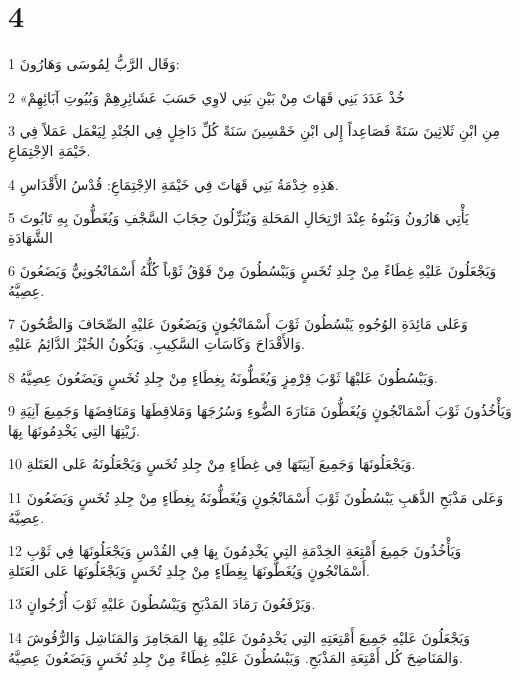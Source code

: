 \chapter{4}

\par 1 وَقَال الرَّبُّ لِمُوسَى وَهَارُونَ:
\par 2 «خُذْ عَدَدَ بَنِي قَهَاتَ مِنْ بَيْنِ بَنِي لاوِي حَسَبَ عَشَائِرِهِمْ وَبُيُوتِ آبَائِهِمْ
\par 3 مِنِ ابْنِ ثَلاثِينَ سَنَةً فَصَاعِداً إِلى ابْنِ خَمْسِينَ سَنَةً كُلِّ دَاخِلٍ فِي الجُنْدِ لِيَعْمَل عَمَلاً فِي خَيْمَةِ الاِجْتِمَاعِ.
\par 4 هَذِهِ خِدْمَةُ بَنِي قَهَاتَ فِي خَيْمَةِ الاِجْتِمَاعِ: قُدْسُ الأَقْدَاسِ.
\par 5 يَأْتِي هَارُونُ وَبَنُوهُ عِنْدَ ارْتِحَالِ المَحَلةِ وَيُنَزِّلُونَ حِجَابَ السَّجْفِ وَيُغَطُّونَ بِهِ تَابُوتَ الشَّهَادَةِ
\par 6 وَيَجْعَلُونَ عَليْهِ غِطَاءً مِنْ جِلدِ تُخَسٍ وَيَبْسُطُونَ مِنْ فَوْقُ ثَوْباً كُلُّهُ أَسْمَانْجُونِيٌّ وَيَضَعُونَ عِصِيَّهُ.
\par 7 وَعَلى مَائِدَةِ الوُجُوهِ يَبْسُطُونَ ثَوْبَ أَسْمَانْجُونٍ وَيَضَعُونَ عَليْهِ الصِّحَافَ وَالصُّحُونَ وَالأَقْدَاحَ وَكَاسَاتِ السَّكِيبِ. وَيَكُونُ الخُبْزُ الدَّائِمُ عَليْهِ.
\par 8 وَيَبْسُطُونَ عَليْهَا ثَوْبَ قِرْمِزٍ وَيُغَطُّونَهُ بِغِطَاءٍ مِنْ جِلدِ تُخَسٍ وَيَضَعُونَ عِصِيَّهُ.
\par 9 وَيَأْخُذُونَ ثَوْبَ أَسْمَانْجُونٍ وَيُغَطُّونَ مَنَارَةَ الضُّوءِ وَسُرُجَهَا وَمَلاقِطَهَا وَمَنَافِضَهَا وَجَمِيعَ آنِيَةِ زَيْتِهَا التِي يَخْدِمُونَهَا بِهَا.
\par 10 وَيَجْعَلُونَهَا وَجَمِيعَ آنِيَتَهَا فِي غِطَاءٍ مِنْ جِلدِ تُخَسٍ وَيَجْعَلُونَهُ عَلى العَتَلةِ.
\par 11 وَعَلى مَذْبَحِ الذَّهَبِ يَبْسُطُونَ ثَوْبَ أَسْمَانْجُونٍ وَيُغَطُّونَهُ بِغِطَاءٍ مِنْ جِلدِ تُخَسٍ وَيَضَعُونَ عِصِيَّهُ.
\par 12 وَيَأْخُذُونَ جَمِيعَ أَمْتِعَةِ الخِدْمَةِ التِي يَخْدِمُونَ بِهَا فِي القُدْسِ وَيَجْعَلُونَهَا فِي ثَوْبِ أَسْمَانْجُونٍ وَيُغَطُّونَهَا بِغِطَاءٍ مِنْ جِلدِ تُخَسٍ وَيَجْعَلُونَهَا عَلى العَتَلةِ.
\par 13 وَيَرْفَعُونَ رَمَادَ المَذْبَحِ وَيَبْسُطُونَ عَليْهِ ثَوْبَ أُرْجُوانٍ.
\par 14 وَيَجْعَلُونَ عَليْهِ جَمِيعَ أَمْتِعَتِهِ التِي يَخْدِمُونَ عَليْهِ بِهَا المَجَامِرَ وَالمَنَاشِل وَالرُّفُوشَ وَالمَنَاضِحَ كُل أَمْتِعَةِ المَذْبَحِ. وَيَبْسُطُونَ عَليْهِ غِطَاءً مِنْ جِلدِ تُخَسٍ وَيَضَعُونَ عِصِيَّهُ.
